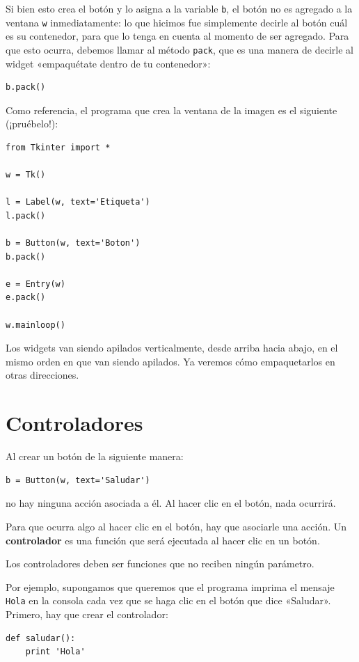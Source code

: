 Si bien esto crea el botón y lo asigna a la variable \lstinline!b!, el
botón no es agregado a la ventana \lstinline!w! inmediatamente: lo que
hicimos fue simplemente decirle al botón cuál es su contenedor, para que
lo tenga en cuenta al momento de ser agregado. Para que esto ocurra,
debemos llamar al método \lstinline!pack!, que es una manera de decirle
al widget «empaquétate dentro de tu contenedor»:

\begin{lstlisting}
b.pack()
\end{lstlisting}

Como referencia, el programa que crea la ventana de la imagen es el
si\-guiente (¡pruébelo!):
\begin{lstlisting}
from Tkinter import *

w = Tk()

l = Label(w, text='Etiqueta')
l.pack()

b = Button(w, text='Boton')
b.pack()

e = Entry(w)
e.pack()

w.mainloop()
\end{lstlisting}



Los widgets van siendo apilados verticalmente, desde arriba hacia abajo,
en el mismo orden en que van siendo apilados. Ya veremos cómo
empaquetarlos en otras direcciones.

\section{Controladores}

Al crear un botón de la siguiente manera:
\begin{lstlisting}
b = Button(w, text='Saludar')
\end{lstlisting}
no hay ninguna acción asociada a él. Al hacer clic en el botón, nada
ocurrirá.

Para que ocurra algo al hacer clic en el botón, hay que asociarle una
acción. Un \textbf{controlador} es una función que será ejecutada al
hacer clic en un botón.

Los controladores deben ser funciones que no reciben ningún parámetro.

Por ejemplo, supongamos que queremos que el programa imprima el mensaje
\lstinline!Hola! en la consola cada vez que se haga clic en el botón que
dice «Saludar». Primero, hay que crear el controlador:
\begin{lstlisting}
def saludar():
    print 'Hola'
\end{lstlisting}

